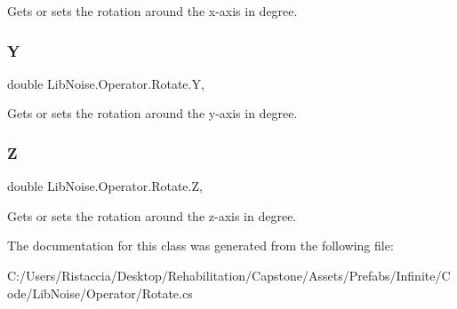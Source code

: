 Gets or sets the rotation around the x-\/axis in degree. 

\mbox{\label{class_lib_noise_1_1_operator_1_1_rotate_aec1ab96c96d77a72587fb4aa4ff957cd}} 
\subsubsection{\texorpdfstring{Y}{Y}}
{\footnotesize\ttfamily double Lib\+Noise.\+Operator.\+Rotate.\+Y\hspace{0.3cm}{\ttfamily [get]}, {\ttfamily [set]}}



Gets or sets the rotation around the y-\/axis in degree. 

\mbox{\label{class_lib_noise_1_1_operator_1_1_rotate_a84d039eb6c6965ace980329a78cf8472}} 
\subsubsection{\texorpdfstring{Z}{Z}}
{\footnotesize\ttfamily double Lib\+Noise.\+Operator.\+Rotate.\+Z\hspace{0.3cm}{\ttfamily [get]}, {\ttfamily [set]}}



Gets or sets the rotation around the z-\/axis in degree. 



The documentation for this class was generated from the following file\+:\begin{DoxyCompactItemize}
\item 
C\+:/\+Users/\+Ristaccia/\+Desktop/\+Rehabilitation/\+Capstone/\+Assets/\+Prefabs/\+Infinite/\+Code/\+Lib\+Noise/\+Operator/Rotate.\+cs\end{DoxyCompactItemize}
